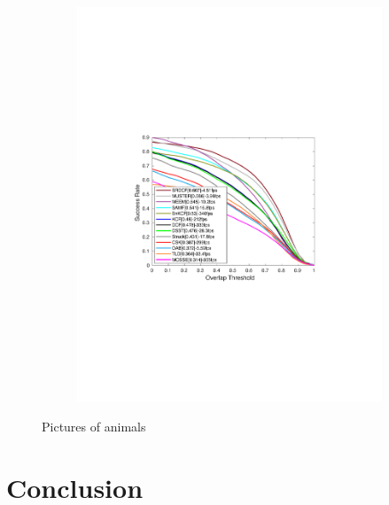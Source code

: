 \documentclass[10pt,twocolumn,letterpaper]{article}
\newcounter{ct}
\begin{document}
\begin{figure}
\begin{subfigure}[b]{0.25\textwidth}
                \includegraphics[width=\linewidth]{./figures/Success_OTB100.pdf}
        \end{subfigure}%
        \caption{Pictures of animals}\label{fig:animals}
\end{figure}


\section{Conclusion} \label{sc:Conclusion}


\small


\end{document}
